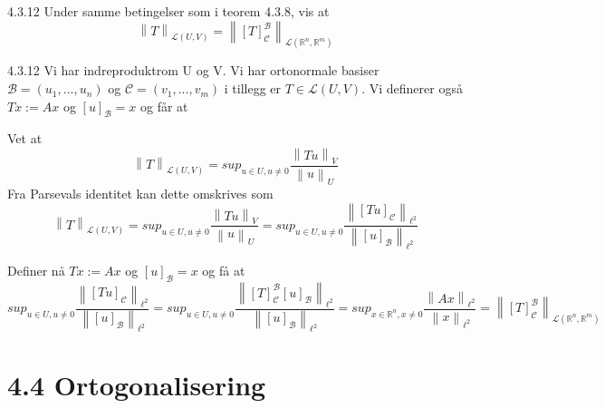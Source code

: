 \documentclass[a4paper,norsk]{article}
\begin{document}
\begin{oppgavebox}{4.3.12}{}
Under samme betingelser som i teorem 4.3.8, vis at 
\[
    \left\lVert T \right\rVert _{ \mathcal{L} \left( U, V \right) } = \left\lVert \left[ T \right] _{\mathcal{C}}^{\mathcal{B}} \right\rVert _{\mathcal{L} \left( \mathbb{R}^n, \mathbb{R}^m \right) }
\]

\begin{proofbox}{4.3.12}{}
Vi har indreproduktrom U og V. Vi har ortonormale basiser $ \mathcal{B} = \left( u_1, ..., u_n \right)  $ og $ \mathcal{C} = \left( v_1, ..., v_m \right)  $ i tillegg er $ T \in \mathcal{L} \left( U, V \right)   $. Vi definerer også $ Tx := Ax $ og $ \left[ u \right] _{\mathcal{B}} = x $ og får at


Vet at 
\[
    \left\lVert T \right\rVert _{\mathcal{L} \left( U, V \right) } = sup_{u \in U, u\neq 0} \frac{ \left\lVert Tu \right\rVert _V }{ \left\lVert u \right\rVert _U }
\]
Fra Parsevals identitet kan dette omskrives som
\[
    \left\lVert T \right\rVert _{\mathcal{L} \left( U, V \right) } = sup_{u \in U, u\neq 0} \frac{ \left\lVert Tu \right\rVert _V }{ \left\lVert u \right\rVert _U } = sup_{u \in  U, u\neq 0} \frac{ \left\lVert \left[ Tu \right] _{\mathcal{C}} \right\rVert_{\ell^2}  }{ \left\lVert \left[ u \right] _{\mathcal{B}} \right\rVert_{\ell^2  }} 
\]

Definer nå $ Tx := Ax $ og $ \left[ u \right] _{\mathcal{B}} = x $ og få at
\[
    sup_{u \in  U, u\neq 0} \frac{ \left\lVert \left[ Tu \right] _{\mathcal{C}} \right\rVert_{\ell^2}  }{ \left\lVert \left[ u \right] _{\mathcal{B}} \right\rVert_{\ell^2  }} = sup_{u \in U, u\neq 0} \frac{ \left\lVert \left[ T \right] _{\mathcal{C}}^{\mathcal{B}} \left[ u \right] _{\mathcal{B}} \right\rVert_{\ell^2}  }{ \left\lVert \left[ u \right]_{\mathcal{B}}  \right\rVert_{\ell^2}  }
    = sup_{x \in \mathbb{R}^n, x\neq 0} \frac{ \left\lVert Ax \right\rVert _{\ell^2} }{ \left\lVert x \right\rVert _{\ell^2 }} = \left\lVert \left[ T \right] _{\mathcal{C}}^{\mathcal{B}} \right\rVert _{\mathcal{L} \left( \mathbb{R}^n, \mathbb{R}^m \right) }
\]

\end{proofbox}
\end{oppgavebox}

\section*{4.4 Ortogonalisering}
\end{document}
